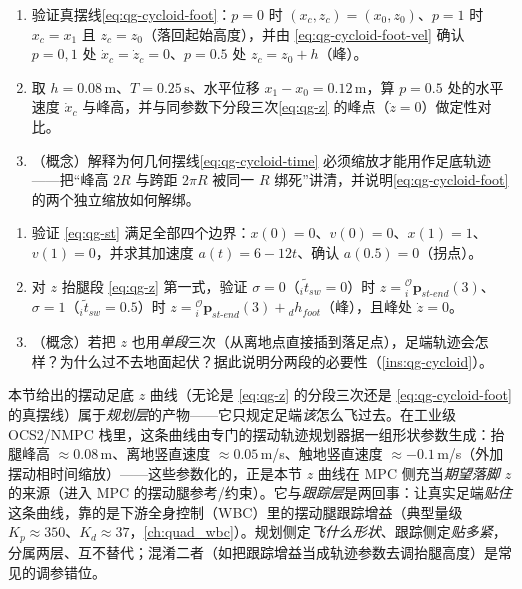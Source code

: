 \begin{practice}
\begin{enumerate}
  \item 验证真摆线\cref{eq:qg-cycloid-foot}：$p=0$ 时 $(x_c,z_c)=(x_0,z_0)$、$p=1$ 时 $x_c=x_1$ 且 $z_c=z_0$（落回起始高度），并由 \cref{eq:qg-cycloid-foot-vel} 确认 $p=0,1$ 处 $\dot x_c=\dot z_c=0$、$p=0.5$ 处 $z_c=z_0+h$（峰）。
  \item 取 $h=0.08\,\mathrm{m}$、$T=0.25\,\mathrm{s}$、水平位移 $x_1-x_0=0.12\,\mathrm{m}$，算 $p=0.5$ 处的水平速度 $\dot x_c$ 与峰高，并与同参数下分段三次\cref{eq:qg-z} 的峰点（$\dot z=0$）做定性对比。
  \item （概念）解释为何几何摆线\cref{eq:qg-cycloid-time} 必须缩放才能用作足底轨迹——把“峰高 $2R$ 与跨距 $2\pi R$ 被同一 $R$ 绑死”讲清，并说明\cref{eq:qg-cycloid-foot} 的两个独立缩放如何解绑。
\end{enumerate}
\end{practice}

\begin{practice}
\begin{enumerate}
  \item 验证 \cref{eq:qg-st} 满足全部四个边界：$x(0)=0$、$v(0)=0$、$x(1)=1$、$v(1)=0$，并求其加速度 $a(t)=6-12t$、确认 $a(0.5)=0$（拐点）。
  \item 对 $z$ 抬腿段 \cref{eq:qg-z} 第一式，验证 $\sigma=0$（${}_i\tilde t_{sw}=0$）时 $z={}_i^{\mathcal{O}}\boldsymbol{p}_{st\text{-}end}(3)$、$\sigma=1$（${}_i\tilde t_{sw}=0.5$）时 $z={}_i^{\mathcal{O}}\boldsymbol{p}_{st\text{-}end}(3)+{}_dh_{foot}$（峰），且峰处 $\dot z=0$。
  \item （概念）若把 $z$ 也用\emph{单段}三次（从离地点直接插到落足点），足端轨迹会怎样？为什么过不去地面起伏？据此说明分两段的必要性（\cref{ins:qg-cycloid}）。
\end{enumerate}
\end{practice}

\begin{note}\label{note:qg-swing-two-layers}
本节给出的摆动足底 $z$ 曲线（无论是 \cref{eq:qg-z} 的分段三次还是 \cref{eq:qg-cycloid-foot} 的真摆线）属于\emph{规划层}的产物——它只规定足端\emph{该}怎么飞过去。在工业级 OCS2/NMPC 栈里，这条曲线由专门的摆动轨迹规划器据一组形状参数生成：抬腿峰高 $\approx0.08\,$m、离地竖直速度 $\approx0.05\,$m/s、触地竖直速度 $\approx-0.1\,$m/s（外加摆动相时间缩放）——这些参数化的，正是本节 $z$ 曲线在 MPC 侧充当\emph{期望落脚 $z$}的来源（进入 MPC 的摆动腿参考/约束）。它与\emph{跟踪层}是两回事：让真实足端\emph{贴住}这条曲线，靠的是下游全身控制（WBC）里的摆动腿跟踪增益（典型量级 $K_p\approx350$、$K_d\approx37$，\cref{ch:quad_wbc}）。规划侧定\emph{飞什么形状}、跟踪侧定\emph{贴多紧}，分属两层、互不替代；混淆二者（如把跟踪增益当成轨迹参数去调抬腿高度）是常见的调参错位。
\end{note}

